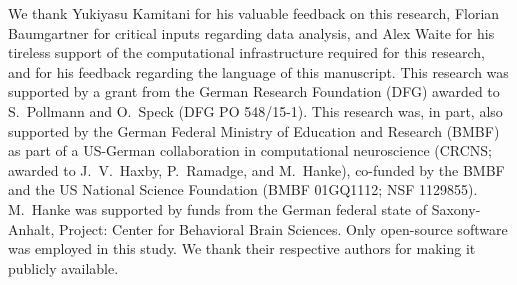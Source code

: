
\noindent We thank
Yukiyasu Kamitani for his valuable feedback on this research, Florian
Baumgartner for critical inputs regarding data analysis, and Alex
Waite for his tireless support of the computational infrastructure required for
this research, and for his feedback regarding the language of this manuscript.
This research was supported by a grant from the German Research Foundation
(DFG) awarded to S.~Pollmann and O.~Speck (DFG PO 548/15-1).
%
This research was, in part, also supported by the German Federal Ministry of
Education and Research (BMBF) as part of a US-German collaboration in
computational neuroscience (CRCNS; awarded to J.~V.~Haxby, P.~Ramadge, and
M.~Hanke), co-funded by the BMBF and the US National Science Foundation (BMBF
01GQ1112; NSF 1129855). M.~Hanke was supported by funds from the German federal
state of Saxony-Anhalt, Project: Center for Behavioral Brain Sciences.
%
Only open-source software was employed in this study. We thank their respective
authors for making it publicly available.
